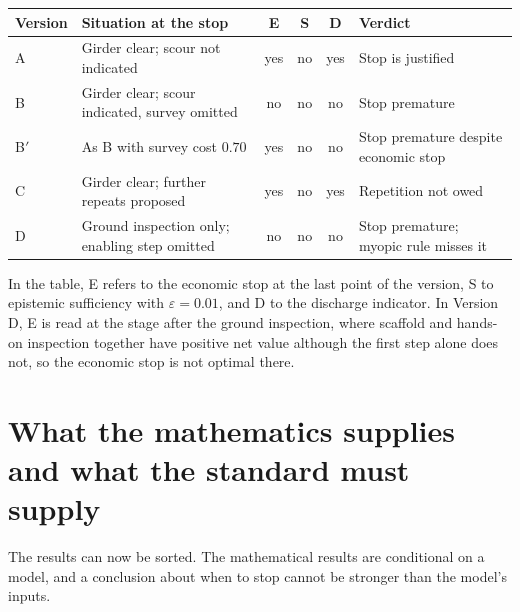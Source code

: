 \documentclass[11pt]{article}
\theoremstyle{plain}
\theoremstyle{definition}
\begin{document}
\begin{center}
\small
\begin{tabular}{@{}p{}p{}ccc p{}@{}}
\hline
Version & Situation at the stop & E & S & D & Verdict\\
\hline
A & Girder clear; scour not indicated & yes & no & yes & Stop is justified\\
B & Girder clear; scour indicated, survey omitted & no & no & no & Stop premature\\
B$'$ & As B with survey cost $0.70$ & yes & no & no & Stop premature despite economic stop\\
C & Girder clear; further repeats proposed & yes & no & yes & Repetition not owed\\
D & Ground inspection only; enabling step omitted & no & no & no & Stop premature; myopic rule misses it\\
\hline
\end{tabular}
\end{center}

In the table, E refers to the economic stop at the last point of the version, S to epistemic sufficiency with $\varepsilon=0.01$, and D to the discharge indicator. In Version D, E is read at the stage after the ground inspection, where scaffold and hands-on inspection together have positive net value although the first step alone does not, so the economic stop is not optimal there.

\section{What the mathematics supplies and what the standard must supply}\label{sec:supply}

The results can now be sorted. The mathematical results are conditional on a model, and a conclusion about when to stop cannot be stronger than the model's inputs.
\end{document}
